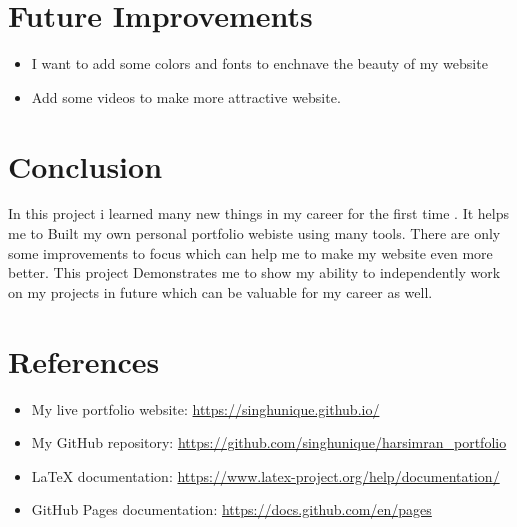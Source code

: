 \documentclass{article}
\begin{document}
\section{Future Improvements}
\begin{itemize}
    \item I want to add some colors and fonts to enchnave the beauty of my website
    \item Add some videos  to make more attractive website.
\end{itemize}    

\section{Conclusion}
In this project i learned many new things in my career for the first time . It helps me to Built my own personal portfolio webiste using many tools. There are only some improvements to focus which can help me to make my website even more better. This project Demonstrates me to show my ability to independently work on my projects in future which can be valuable for my career as well. 

\section{References}

\begin{itemize}
    \item My live portfolio website: \url{https://singhunique.github.io/}
    \item My GitHub repository: \url{https://github.com/singhunique/harsimran_portfolio}
    \item LaTeX documentation: \url{https://www.latex-project.org/help/documentation/}
    \item GitHub Pages documentation: \url{https://docs.github.com/en/pages}
\end{itemize}
\end{document}
